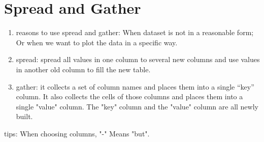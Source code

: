 \section{Spread and Gather}
\begin{enumerate}
  \item reasons to use spread and gather: When dataset is not in a reasonable form; Or when we want to plot the data in a specific way.
  \item spread: spread all values in one column to several new columns and use values in another old column to fill the new table.
  \item gather: it collects a set of column names and places them into a single “key” column. It also collects the cells of those columns and places them into a single "value" column. The "key" column and the "value" column are all newly built. 
\end{enumerate}
tips: When choosing columns, "-" Means "but".


